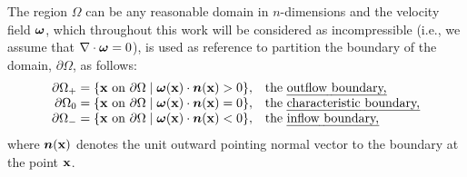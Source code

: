 %
%
%
%

The region $\Omega$ can be any reasonable domain in $n$-dimensions and the velocity field $\bm{\omega}$, which throughout this work will be considered as incompressible (i.e., we assume that $\nabla \cdot \bm{\omega} = 0$), is used as reference to partition the boundary of the domain, $\partial \Omega$, as follows:
%
\begin{equation}\label{eq:back:bc}
\begin{array}{rl}
\partial\Omega_{+} = \{\mathbf{x}\text{ on }\partial\Omega \;|\;
\bm{\omega}(\mathbf{x})\cdot\bm{n}(\mathbf{x})>0\},
& \text{the \emph{outflow boundary,}}\\
\partial\Omega_{0} = \{\mathbf{x}\text{ on }\partial\Omega \;|\;
\bm{\omega}(\mathbf{x})\cdot\bm{n}(\mathbf{x})=0\},
& \text{the \emph{characteristic boundary,}}\\
\partial\Omega_{-} = \{\mathbf{x}\text{ on }\partial\Omega \;|\;
\bm{\omega}(\mathbf{x})\cdot\bm{n}(\mathbf{x})<0\},
& \text{the \emph{inflow boundary,}}\\
\end{array}
\end{equation}
where $\bm{n}(\mathbf{x})$ denotes the unit outward pointing normal vector to the boundary
at the point $\mathbf{x}$.

